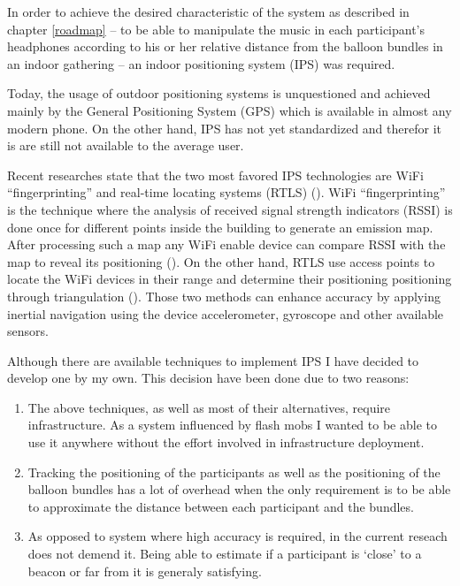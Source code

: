 
In order to achieve the desired characteristic of the system as described in chapter \ref{roadmap} -- to be able to manipulate the music in each participant's headphones according to his or her relative distance from the balloon bundles in an indoor gathering -- an indoor positioning system (IPS) was required.

Today, the usage of outdoor positioning systems is unquestioned and achieved mainly by the General Positioning System (GPS) which is available in almost any modern phone.
On the other hand, IPS has not yet standardized and therefor it is are still not available to the average user.

Recent researches state that the two most favored IPS technologies are WiFi ``fingerprinting'' and real-time locating systems (RTLS) (\cite{web:harrop}).
WiFi ``fingerprinting'' is the technique where the analysis of received signal strength indicators (RSSI) is done once for different points inside the building to generate an emission map.
After processing such a map any WiFi enable device can compare RSSI with the map to reveal its positioning (\cite{chen}).
On the other hand, RTLS use access points to locate the WiFi devices in their range and determine their positioning positioning through triangulation (\cite{liu}).
Those two methods can enhance accuracy by applying inertial navigation using the device accelerometer, gyroscope and other available sensors.

Although there are available techniques to implement IPS I have decided to develop one by my own.
This decision have been done due to two reasons:
\begin{enumerate}
	\item The above techniques, as well as most of their alternatives, require infrastructure.
	As a system influenced by flash mobs I wanted to be able to use it anywhere without the effort involved in infrastructure deployment.
	\item Tracking the positioning of the participants as well as the positioning of the balloon bundles has a lot of overhead when the only requirement is to be able to approximate the distance between each participant and the bundles.
	\item As opposed to system where high accuracy is required, in the current reseach does not demend it.
	Being able to estimate if a participant is `close' to a beacon or far from it is generaly satisfying.
\end{enumerate}


